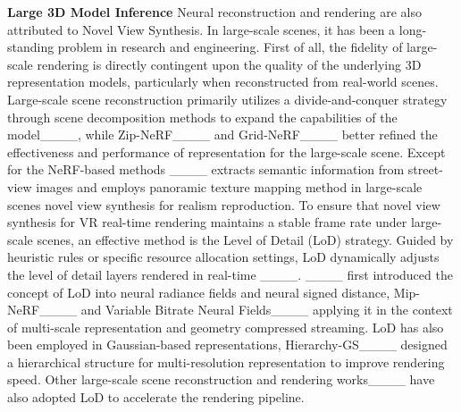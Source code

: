 


\textbf{Large 3D Model Inference} Neural reconstruction and rendering are also attributed to Novel View Synthesis. In large-scale scenes, it has been a long-standing problem in research and engineering. First of all, the fidelity of large-scale rendering is directly contingent upon the quality of the underlying 3D representation models, particularly when reconstructed from real-world scenes. Large-scale scene reconstruction primarily utilizes a divide-and-conquer strategy through scene decomposition methods to expand the capabilities of the model____, while Zip-NeRF____ and Grid-NeRF____ better refined the effectiveness and performance of representation for the large-scale scene. Except for the NeRF-based methods ____ extracts semantic information from street-view images and employs panoramic texture mapping method in large-scale scenes novel view synthesis for realism reproduction. To ensure that novel view synthesis for VR real-time rendering maintains a stable frame rate under large-scale scenes, an effective method is the Level of Detail (LoD) strategy.  Guided by heuristic rules or specific resource allocation settings, LoD dynamically adjusts the level of detail layers rendered in real-time ____. ____ first introduced the concept of LoD into neural radiance fields and neural signed distance, Mip-NeRF____ and Variable Bitrate Neural Fields____ applying it in the context of multi-scale representation and geometry compressed streaming. LoD has also been employed in Gaussian-based representations, Hierarchy-GS____ designed a hierarchical structure for multi-resolution representation to improve rendering speed. Other large-scale scene reconstruction and rendering works____ have also adopted LoD to accelerate the rendering pipeline.




